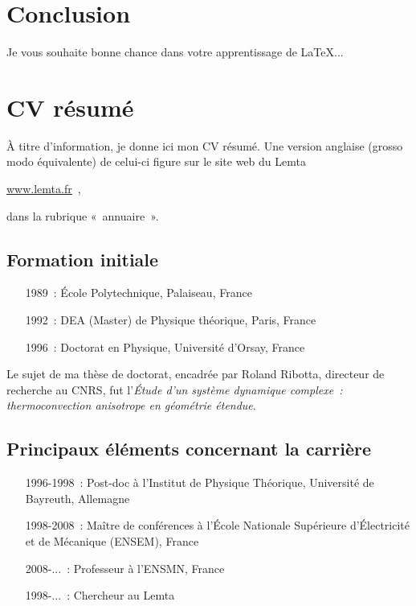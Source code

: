 \documentclass[12pt]{report}
\begin{document}
\chapter*{Conclusion}
Je vous souhaite bonne chance dans votre apprentissage de \LaTeX...
\clearpage
\appendix
\def\chaptername{Annexe}
\chapter{CV résumé}
\label{annexe:CV}
À titre d'information, je donne ici mon CV résumé.
Une version anglaise (grosso modo équivalente)
de celui-ci figure sur le site web du Lemta
\begin{center}
  \href{http://www.lemta.fr}{\underline{www.lemta.fr}}~,
\end{center}
dans la rubrique «~annuaire~».
\section{Formation initiale}
\begin{itemize}
\item[1989~:] École Polytechnique, Palaiseau, France
\vskip2mm

\item[1992~:] DEA (Master) de Physique théorique, Paris, France
\vskip2mm

\item[1996~:] Doctorat en Physique, Université d'Orsay, France
\end{itemize}
\vskip2mm

\noindent
Le sujet de ma thèse de doctorat, encadrée par Roland Ribotta,
directeur de recherche au CNRS, fut
l'\emph{Étude d'un système dynamique complexe~: thermoconvection anisotrope
en géométrie étendue}.
\section{Principaux éléments concernant la carrière}
\begin{itemize}
\item[1996-1998~:] Post-doc à l'Institut de Physique Théorique,
Université de Bayreuth, Allemagne
\vskip2mm

\item[1998-2008~:] Maître de conférences à l'École Nationale Supérieure
d'Électricité et de Mécanique (ENSEM), France
\vskip2mm

\item[2008-...~:] Professeur à l'ENSMN, France
\vskip2mm

\item[1998-...~:] Chercheur au Lemta
\end{itemize}
\end{document}
